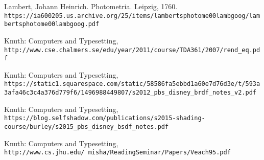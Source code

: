 \begin{thebibliography}{9}

	Lambert, Johann Heinrich. Photometria. Leipzig, 1760.
	\\\texttt{https://ia600205.us.archive.org/25/items/lambertsphotome00lambgoog/lambertsphotome00lambgoog.pdf}

	Knuth: Computers and Typesetting,
	\\\texttt{http://www.cse.chalmers.se/edu/year/2011/course/TDA361/2007/rend\_eq.pdf}
	
	Knuth: Computers and Typesetting,
	\\\texttt{https://static1.squarespace.com/static/58586fa5ebbd1a60e7d76d3e/t/593a3afa46c3c4a376d779f6/1496988449807/s2012\_pbs\_disney\_brdf\_notes\_v2.pdf}
	
	Knuth: Computers and Typesetting,
	\\\texttt{https://blog.selfshadow.com/publications/s2015-shading-course/burley/s2015\_pbs\_disney\_bsdf\_notes.pdf}
	
	Knuth: Computers and Typesetting,
	\\\texttt{http://www.cs.jhu.edu/~misha/ReadingSeminar/Papers/Veach95.pdf}
	
\end{thebibliography}











